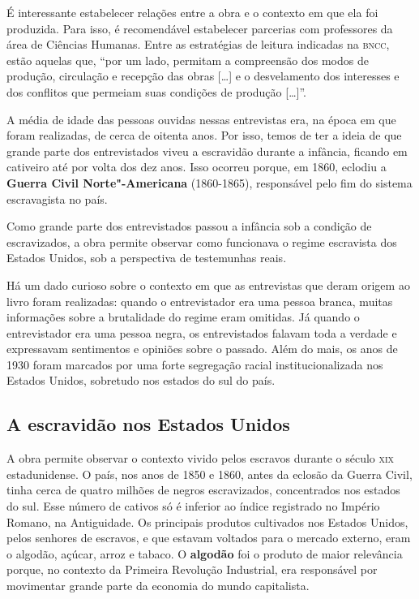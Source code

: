 \documentclass[11pt]{extarticle}
\begin{document}




É interessante estabelecer relações entre a obra e o contexto em que ela
foi produzida. Para isso, é recomendável estabelecer parcerias com
professores da área de Ciências Humanas. Entre as estratégias de leitura
indicadas na \textsc{bncc}, estão aquelas que, ``por um lado, permitam a
compreensão dos modos de produção, circulação e recepção das obras
{[}\ldots{}{]} e o desvelamento dos interesses e dos conflitos que permeiam
suas condições de produção {[}\ldots{}{]}''.

A média de idade das pessoas ouvidas nessas entrevistas era, na época em
que foram realizadas, de cerca de oitenta anos. Por isso, temos de ter a
ideia de que grande parte dos entrevistados viveu a escravidão durante a
infância, ficando em cativeiro até por volta dos dez anos. Isso ocorreu
porque, em 1860, eclodiu a \textbf{Guerra Civil Norte"-Americana}
(1860-1865), responsável pelo fim do sistema escravagista no país.

Como grande parte dos entrevistados passou a infância sob a condição de
escravizados, a obra permite observar como funcionava o regime
escravista dos Estados Unidos, sob a perspectiva de testemunhas reais.






Há um dado curioso sobre o contexto em que as entrevistas que deram
origem ao livro foram realizadas: quando o entrevistador era uma pessoa
branca, muitas informações sobre a brutalidade do regime eram omitidas.
Já quando o entrevistador era uma pessoa negra, os entrevistados falavam
toda a verdade e expressavam sentimentos e opiniões sobre o passado.
Além do mais, os anos de 1930 foram marcados por uma forte segregação
racial institucionalizada nos Estados Unidos, sobretudo nos estados do
sul do país.

\subsection{A escravidão nos Estados Unidos}

A obra permite observar o contexto vivido pelos escravos durante o
século \textsc{xix} estadunidense. O país, nos anos de 1850 e 1860, antes da
eclosão da Guerra Civil, tinha cerca de quatro milhões de negros
escravizados, concentrados nos estados do sul. Esse número de cativos só
é inferior ao índice registrado no Império Romano, na Antiguidade. Os
principais produtos cultivados nos Estados Unidos, pelos senhores de
escravos, e que estavam voltados para o mercado externo, eram o algodão,
açúcar, arroz e tabaco. O \textbf{algodão} foi o produto de maior
relevância porque, no contexto da Primeira Revolução Industrial, era
responsável por movimentar grande parte da economia do mundo
capitalista.
\end{document}

